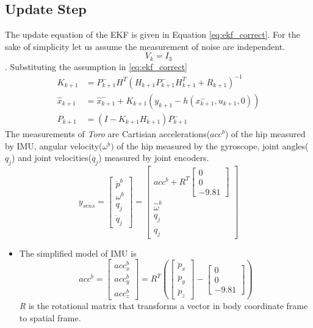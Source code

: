 \begin{enumerate}
\section{Update Step}
The update equation of the EKF is given in Equation \ref{eq:ekf_correct}. For the sake of simplicity let us assume the measurement of noise are independent. $$V_k = I_3$$. Substituting the assumption in \ref{eq:ekf_correct}
\begin{equation}
\label{eq:correct}
\begin{split}
K_{k+1} &= P_{k+1}^-H^T(H_{k+1}P_{k+1}^-H_{k+1}^T + R_{k+1})^{-1}\\
\hat{x}_{k+1} &= \hat{x}_{k+1}^- + K_{k+1}(y_{k+1}-h(x_{k+1}^-,u_{k+1},0))\\
P_{k+1} &= (I- K_{k+1}H_{k+1})P_{k+1}^-
\end{split}
\end{equation}
The measurements of \emph{Toro} are Cartisian accelerations($acc^b$) of the hip measured by IMU, angular velocity($\omega^b)$ of the hip measured by the gyroscope, joint angles($q_j$) and joint velocities($\dot{q_j}$) measured by joint encoders.
\begin{equation}
     y_{sens} = \begin{bmatrix} \ddot{p}^b \\ \omega^b \\ q_j \\ \dot{q}_j \end{bmatrix} =
	\begin{bmatrix}
	acc^b+R^T \begin{bmatrix}0 \\0 \\-9.81 \end{bmatrix} \\ \hat{\omega}^{b}\\ q_{j} \\ \dot{q}_{j} 
	\end{bmatrix}
\end{equation}
\begin{itemize}
    \item The simplified model of IMU is $$ acc^b= \begin{bmatrix} acc^b_x \\ acc^b_y \\ acc^b_z \end{bmatrix} = R^T( \begin{bmatrix}\ddot{p}_x \\ \ddot{p}_y \\ \ddot{p}_z \end{bmatrix} - \begin{bmatrix}0 \\0 \\-9.81 \end{bmatrix})$$ \emph{R} is the rotational matrix that transforms a vector in body coordinate frame to spatial frame.

\end{itemize}
\end{enumerate}
